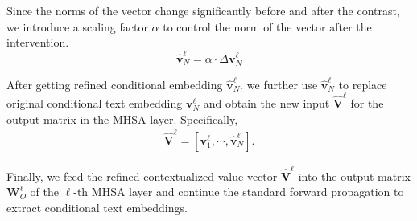 \documentclass[11pt]{article}
\newcommand{\vv}{\mathbf{v}}
\begin{document}
Since the norms of the vector change significantly before and after the contrast, we introduce a scaling factor $\alpha$ to control the norm of the vector after the intervention.
\begin{equation}
\hat{\vv}^{\ell}_{N} =  \alpha \cdot \Delta\vv^{\ell}_N
\end{equation}

After getting refined conditional embedding $\hat{\vv}^{\ell}_{N}$, we further use $\hat{\vv}^{\ell}_{N}$ to replace original conditional text embedding $\vv^{\ell}_{N}$ and obtain the new input $\hat{\mathbf{V}}^{\ell}$ for the output matrix in the MHSA layer.
Specifically,
\begin{align}
   \hat{\mathbf{V}}^{\ell} = [\vv^{\ell}_1, \cdots, \hat{\vv}^{\ell}_{N}].
\end{align}

Finally, we feed the refined contextualized value vector $\hat{\mathbf{V}}^{\ell}$ into the output matrix $\mathbf{W}^{\ell}_O$ of the $\ell$-th MHSA layer and continue the standard forward propagation to extract conditional text embeddings.
\end{document}
